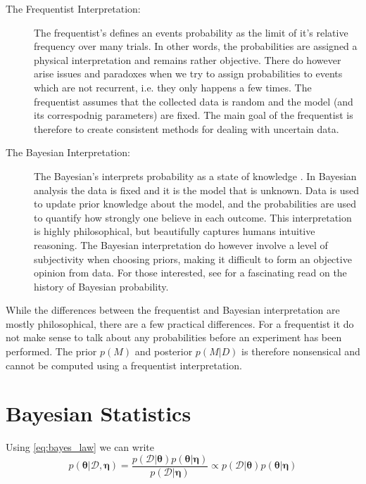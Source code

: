 \begin{description}
    \item[The Frequentist Interpretation:] The frequentist's defines an events probability as the limit of it's relative frequency over many trials. In other words, the probabilities are assigned a physical interpretation and remains rather objective. There do however arise issues and paradoxes when we try to assign probabilities to events which are not recurrent, i.e. they only happens a few times. The frequentist assumes that the collected data is random and the model (and its correspodnig parameters) are fixed. The main goal of the frequentist is therefore to create consistent methods for dealing with uncertain data.
    \item[The Bayesian Interpretation:] The Bayesian's interprets probability as a state of knowledge \cite{Jaynes86bayesianmethods:}. In Bayesian analysis the data is fixed and it is the model that is unknown. Data is used to update prior knowledge about the model, and the probabilities are used to quantify how strongly one believe in each outcome. This interpretation is highly philosophical, but beautifully captures humans intuitive reasoning. The Bayesian interpretation do however involve a level of subjectivity when choosing priors, making it difficult to form an objective opinion from data. For those interested, see \Cite{Jaynes86bayesianmethods:} for a fascinating read on the history of Bayesian probability.
\end{description}

While the differences between the frequentist and Bayesian interpretation are mostly philosophical, there are a few practical differences. For a frequentist it do not make sense to talk about any probabilities before an experiment has been performed. The prior $p(M)$ and posterior $p(M | D)$ is therefore nonsensical and cannot be computed using a frequentist interpretation.






\section{Bayesian Statistics}

Using \cref{eq:bayes_law} we can write 
\begin{equation}\label{eq:bayes_learning}
    p(\boldsymbol{\theta}| \mathcal{D}, \boldsymbol{\eta}) = \frac{p(\mathcal{D} | \boldsymbol{\theta}) p(\boldsymbol{\theta} | \boldsymbol{\eta})}{p(\mathcal{D} | \boldsymbol{\eta})} \propto p(\mathcal{D} | \boldsymbol{\theta})p(\boldsymbol{\theta} | \boldsymbol{\eta})
\end{equation}

